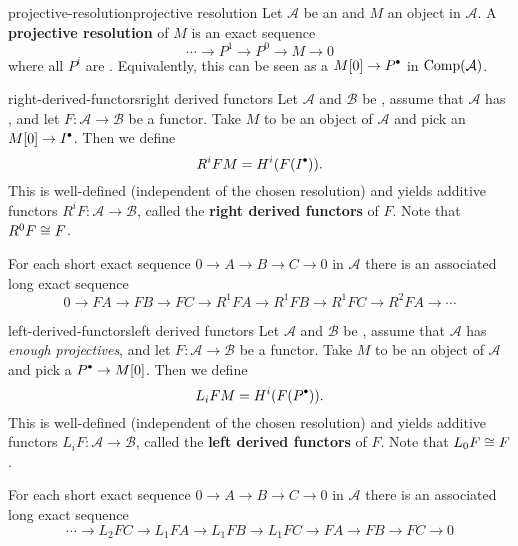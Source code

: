 \begin{topic}{projective-resolution}{projective resolution}
    Let $\mathcal{A}$ be an  and $M$ an object in $\mathcal{A}$. A \textbf{projective resolution} of $M$ is an exact sequence
    \[ \cdots \to P^1 \to P^0 \to M \to 0 \]
    where all $P^i$ are . Equivalently, this can be seen as a  $M[0] \to P^\bdot$ in $\textup{Comp}(\mathcal{A})$.
\end{topic}

\begin{topic}{right-derived-functors}{right derived functors}
    Let $\mathcal{A}$ and $\mathcal{B}$ be , assume that $\mathcal{A}$ has , and let $F : \mathcal{A} \to \mathcal{B}$ be a  functor. Take $M$ to be an object of $\mathcal{A}$ and pick an  $M[0] \to I^\bdot$. Then we define
    \[ R^i F M = H^i(F(I^\bdot)) . \]
    This is well-defined (independent of the chosen resolution) and yields additive functors $R^i F : \mathcal{A} \to \mathcal{B}$, called the \textbf{right derived functors} of $F$. Note that $R^0 F \cong F$.
    
    For each short exact sequence $0 \to A \to B \to C \to 0$ in $\mathcal{A}$ there is an associated long exact sequence
    \[ 0 \to FA \to FB \to FC \to R^1FA \to R^1FB \to R^1FC \to R^2FA \to \cdots \]
\end{topic}

\begin{topic}{left-derived-functors}{left derived functors}
    Let $\mathcal{A}$ and $\mathcal{B}$ be , assume that $\mathcal{A}$ has \textit{enough projectives}, and let $F : \mathcal{A} \to \mathcal{B}$ be a  functor. Take $M$ to be an object of $\mathcal{A}$ and pick a  $P^\bdot \to M[0]$. Then we define
    \[ L_i F M = H^i(F(P^\bdot)) . \]
    This is well-defined (independent of the chosen resolution) and yields additive functors $L_i F : \mathcal{A} \to \mathcal{B}$, called the \textbf{left derived functors} of $F$. Note that $L_0 F \cong F$.
    
    For each short exact sequence $0 \to A \to B \to C \to 0$ in $\mathcal{A}$ there is an associated long exact sequence
    \[ \cdots \to L_2 FC \to L_1 FA \to L_1 FB \to L_1 FC \to FA \to FB \to FC \to 0 \]
\end{topic}

